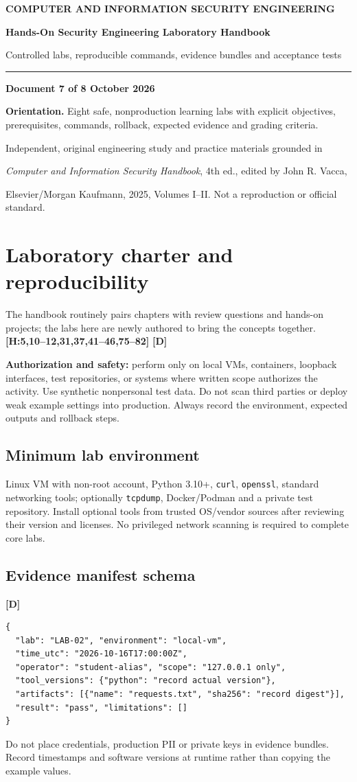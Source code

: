 \documentclass[10pt,letterpaper,oneside]{article}
\newcommand{\handbookref}[1]{\textsf{\color{accent}\textbf{[H:#1]}}}
\newcommand{\designed}{\textsf{\color{accent}\textbf{[D]}}}
\newcommand{\makereportcover}[4]{%
\hypersetup{pageanchor=false}%

\thispagestyle{empty}\vspace*{1.15in}
{\small\bfseries\color{accent} COMPUTER AND INFORMATION SECURITY ENGINEERING}\par\vspace{13pt}
{\Huge\bfseries\color{ink} #1\par}\vspace{15pt}
{\Large\color{muted} #2\par}\vspace{18pt}
\color{accent}\rule{0.94\textwidth}{2.1pt}\par\vspace{20pt}
{\normalsize\bfseries Document #3 of 8 \quad\textbullet\quad 16 October 2026\par}
\vspace{0.35in}
\begin{sourcebox}\textbf{Orientation.} #4\end{sourcebox}
\vfill
{\small\color{muted} Independent, original engineering study and practice materials grounded in\par
\emph{Computer and Information Security Handbook}, 4th ed., edited by John R. Vacca,\par
Elsevier/Morgan Kaufmann, 2025, Volumes I--II. Not a reproduction or official standard.}
\newpage\hypersetup{pageanchor=true}\setcounter{page}{1}\tableofcontents\newpage
}
\begin{document}
\makereportcover{Hands-On Security Engineering Laboratory Handbook}{Controlled labs, reproducible commands, evidence bundles and acceptance tests}{7}{Eight safe, nonproduction learning labs with explicit objectives, prerequisites, commands, rollback, expected evidence and grading criteria.}

\section{Laboratory charter and reproducibility}
The handbook routinely pairs chapters with review questions and hands-on projects; the labs here are newly authored to bring the concepts together. \handbookref{5,10--12,31,37,41--46,75--82} \designed{}
\begin{warningbox}\textbf{Authorization and safety:} perform only on local VMs, containers, loopback interfaces, test repositories, or systems where written scope authorizes the activity. Use synthetic nonpersonal test data. Do not scan third parties or deploy weak example settings into production. Always record the environment, expected outputs and rollback steps.\end{warningbox}
\subsection{Minimum lab environment}
Linux VM with non-root account, Python 3.10+, \texttt{curl}, \texttt{openssl}, standard networking tools; optionally \texttt{tcpdump}, Docker/Podman and a private test repository. Install optional tools from trusted OS/vendor sources after reviewing their version and licenses. No privileged network scanning is required to complete core labs.
\subsection{Evidence manifest schema}\designed{}
\begin{lstlisting}[caption={Example evidence bundle manifest (illustrative JSON)}]
{
  "lab": "LAB-02", "environment": "local-vm",
  "time_utc": "2026-10-16T17:00:00Z",
  "operator": "student-alias", "scope": "127.0.0.1 only",
  "tool_versions": {"python": "record actual version"},
  "artifacts": [{"name": "requests.txt", "sha256": "record digest"}],
  "result": "pass", "limitations": []
}
\end{lstlisting}
Do not place credentials, production PII or private keys in evidence bundles. Record timestamps and software versions at runtime rather than copying the example values.
\end{document}

